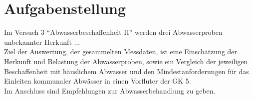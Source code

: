 \chapter{Aufgabenstellung}
\label{sec:aufgabenstellung}

Im Versuch 3 "`Abwasserbeschaffenheit II"' werden drei Abwasserproben unbekannter Herkunft ... \\
Ziel der Auswertung, der gesammelten Messdaten, ist eine Einschätzung der Herkunft und Belastung der Abwasserproben, sowie ein Vergleich der jeweiligen Beschaffenheit mit häuslichem Abwasser und den Mindestanforderungen für das Einleiten kommunaler Abwässer in einen Vorfluter der GK 5. \\
Im Anschluss sind Empfehlungen zur Abwasserbehandlung zu geben.